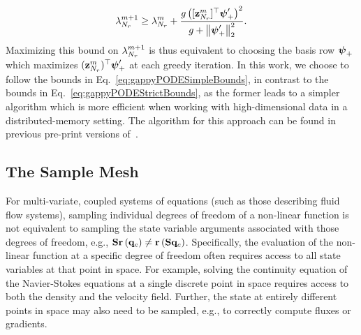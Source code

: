%
\begin{equation}\label{eq:gappyPODESimpleBounds}
    \lambda_{N_r}^{m+1} \ge \lambda_{N_r}^{m} + \frac{g \left( [\mathbf{z}_{N_r}^{m}]^\top \boldsymbol{\psi}'_+ \right)^2}{g + \left\Vert \boldsymbol{\psi}'_+ \right\Vert_2^2}.
\end{equation}
%
Maximizing this bound on $\lambda_{N_r}^{m+1}$ is thus equivalent to choosing the basis row $\boldsymbol{\psi}_+$ which maximizes $(\mathbf{z}_{N_r}^{m})^\top \boldsymbol{\psi}'_+$ at each greedy iteration. In this work, we choose to follow the bounds in Eq.~\ref{eq:gappyPODESimpleBounds}, in contrast to the bounds in Eq.~\ref{eq:gappyPODEStrictBounds}, as the former leads to a simpler algorithm which is more efficient when working with high-dimensional data in a distributed-memory setting. The algorithm for this approach can be found in previous pre-print versions of~\cite{Peherstorfer2020}.

\subsection{The Sample Mesh}

For multi-variate, coupled systems of equations (such as those describing fluid flow systems), sampling individual degrees of freedom of a non-linear function is not equivalent to sampling the state variable arguments associated with those degrees of freedom, e.g., $\mathbf{S} \mathbf{r}\left(\mathbf{q}_{c}\right) \neq \mathbf{r}\left(\mathbf{S} \mathbf{q}_{c}\right)$. Specifically, the evaluation of the non-linear function at a specific degree of freedom often requires access to all state variables at that point in space. For example, solving the continuity equation of the Navier-Stokes equations at a single discrete point in space requires access to both the density and the velocity field. Further, the state at entirely different points in space may also need to be sampled, e.g., to correctly compute fluxes or gradients.


